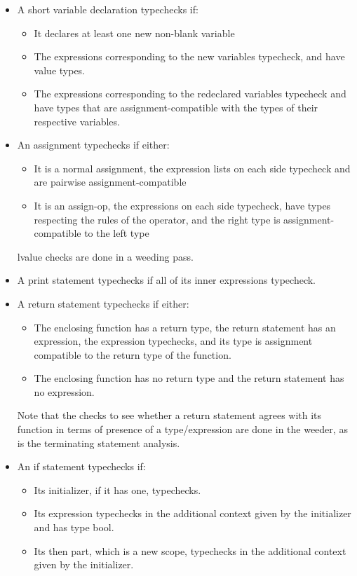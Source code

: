 \documentclass[letterpaper,11pt]{article}
\begin{document}
\begin{itemize}
\item A short variable declaration typechecks if:
	\begin{itemize}
	\item It declares at least one new non-blank variable
	\item The expressions corresponding to the new variables typecheck, and have value types.
	\item The expressions corresponding to the redeclared variables typecheck and have types that are assignment-compatible with the types of their respective variables.
	\end{itemize}
\item An assignment typechecks if either:
	\begin{itemize}
	\item It is a normal assignment, the expression lists on each side typecheck and are pairwise assignment-compatible
	\item It is an assign-op, the expressions on each side typecheck, have types respecting the rules of the operator, and the right type is assignment-compatible to the left type
	\end{itemize}
lvalue checks are done in a weeding pass.
\item A print statement typechecks if all of its inner expressions typecheck.
\item A return statement typechecks if either:
	\begin{itemize}
	\item The enclosing function has a return type, the return statement has an expression, the expression typechecks, and its type is assignment compatible to the return type of the function.
	\item The enclosing function has no return type and the return statement has no expression.
	\end{itemize}
Note that the checks to see whether a return statement agrees with its function in terms of presence of a type/expression are done in the weeder, as is the terminating statement analysis.
\item An if statement typechecks if:
	\begin{itemize}
	\item Its initializer, if it has one, typechecks.
	\item Its expression typechecks in the additional context given by the initializer and has type bool.
	\item Its then part, which is a new scope, typechecks in the additional context given by the initializer.

\end{itemize}
\end{itemize}
\end{document}
